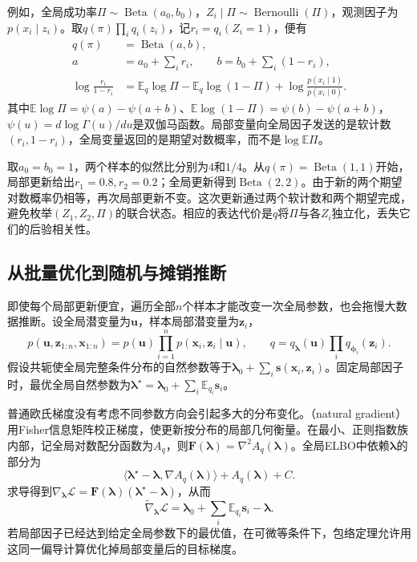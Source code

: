 例如，全局成功率$\Pi\sim\operatorname{Beta}(a_0,b_0)$，$Z_i\mid\Pi\sim\operatorname{Bernoulli}(\Pi)$，观测因子为$p(x_i\mid z_i)$。取$q(\pi)\prod_iq_i(z_i)$，记$r_i=q_i(Z_i=1)$，便有
\begin{equation}
  \begin{aligned}
    q(\pi)&=\operatorname{Beta}(a,b),\\
    a&=a_0+\sum_i r_i,\qquad
    b=b_0+\sum_i(1-r_i),\\
    \log\frac{r_i}{1-r_i}
      &=\mathbb E_q\log\Pi-\mathbb E_q\log(1-\Pi)
         +\log\frac{p(x_i\mid1)}{p(x_i\mid0)}.
  \end{aligned}
  \label{eq:pgm-variational-beta-bernoulli}
\end{equation}
其中$\mathbb E\log\Pi=\psi(a)-\psi(a+b)$、$\mathbb E\log(1-\Pi)=\psi(b)-\psi(a+b)$，$\psi(u)=d\log\Gamma(u)/du$是双伽马函数。局部变量向全局因子发送的是软计数$(r_i,1-r_i)$，全局变量返回的是期望对数概率，而不是$\log\mathbb E\Pi$。

取$a_0=b_0=1$，两个样本的似然比分别为$4$和$1/4$。从$q(\pi)=\operatorname{Beta}(1,1)$开始，局部更新给出$r_1=0.8,r_2=0.2$；全局更新得到$\operatorname{Beta}(2,2)$。由于新的两个期望对数概率仍相等，再次局部更新不变。这次更新通过两个软计数和两个期望完成，避免枚举$(Z_1,Z_2,\Pi)$的联合状态。相应的表达代价是$q$将$\Pi$与各$Z_i$独立化，丢失它们的后验相关性。

\subsection{从批量优化到随机与摊销推断}
\label{sec:pgm-variational-stochastic-amortized}
\label{sec:pgm-variational-scalable}
\label{sec:pgm-variational-svi}

即使每个局部更新便宜，遍历全部$n$个样本才能改变一次全局参数，也会拖慢大数据推断。设全局潜变量为$\bm u$，样本局部潜变量为$\bm z_i$，
\[
  p(\bm u,\bm z_{1:n},\bm x_{1:n})
    =p(\bm u)\prod_{i=1}^n p(\bm x_i,\bm z_i\mid\bm u),
  \qquad
  q=q_{\bm{\lambda}}(\bm u)\prod_iq_{\bm{\phi}_i}(\bm z_i).
\]
假设共轭使全局完整条件分布的自然参数等于$\bm{\lambda}_0+\sum_i\bm s(\bm x_i,\bm z_i)$。固定局部因子时，最优全局自然参数为$\bm{\lambda}^\star=\bm{\lambda}_0+\sum_i\mathbb E_{q_i}\bm s_i$。

普通欧氏梯度没有考虑不同参数方向会引起多大的分布变化。（natural gradient）用Fisher信息矩阵校正梯度，使更新按分布的局部几何衡量。在最小、正则指数族内部，记全局对数配分函数为$A_q$，则$\bm F(\bm{\lambda})=\nabla^2 A_q(\bm{\lambda})$。全局ELBO中依赖$\bm{\lambda}$的部分为
\[
  \langle\bm{\lambda}^\star-\bm{\lambda},
            \nabla A_q(\bm{\lambda})\rangle+A_q(\bm{\lambda})+C.
\]
求导得到$\nabla_{\bm{\lambda}}\mathcal L=\bm F(\bm{\lambda})(\bm{\lambda}^\star-\bm{\lambda})$，从而
\begin{equation}
  \widetilde\nabla_{\bm{\lambda}}\mathcal L
    =\bm{\lambda}_0+\sum_i\mathbb E_{q_i}\bm s_i-\bm{\lambda}.
  \label{eq:pgm-variational-natural-gradient}
\end{equation}
若局部因子已经达到给定全局参数下的最优值，在可微等条件下，包络定理允许用这同一偏导计算优化掉局部变量后的目标梯度。

